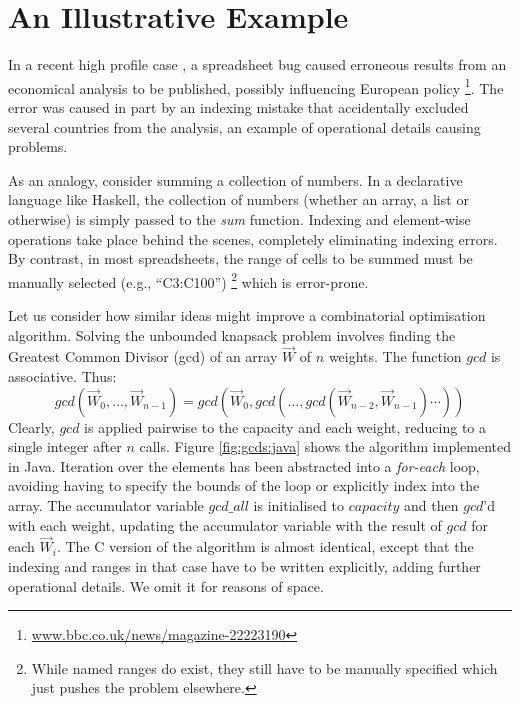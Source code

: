 \section{An Illustrative Example}

In a recent high profile case \cite{Herndon13}, a spreadsheet bug caused
erroneous results from an economical analysis to be published, possibly
influencing European policy%
\footnote{\url{www.bbc.co.uk/news/magazine-22223190}}.
The error was caused in part by an indexing mistake that accidentally excluded
several countries from the analysis, an example of operational details causing
problems.

As an analogy, consider summing a collection of numbers. In a declarative
language like Haskell, the collection of numbers (whether an array, a list or
otherwise) is simply passed to the \emph{sum} function. Indexing and
element-wise operations take place behind the scenes, completely eliminating
indexing errors. By contrast, in most spreadsheets, the range of cells to
be summed must be manually selected (e.g., ``C3:C100'')%
\footnote{While named ranges do exist, they still have to be manually specified
which just pushes the problem elsewhere.} which is error-prone.

Let us consider how similar ideas might improve a combinatorial
optimisation algorithm. Solving the unbounded knapsack problem involves
finding the Greatest Common Divisor (gcd) of an array $\vec{W}$ of $n$
weights. The function $gcd$
is associative. Thus:
\[
gcd (\vec{W}_0, \ldots, \vec{W}_{n-1}) =
gcd(\vec{W}_0,gcd(\ldots,gcd (\vec{W}_{n-2},\vec{W}_{n-1})\cdots))
\]
Clearly, $gcd$ is applied pairwise to the capacity and each weight,
reducing to a single integer after $n$ calls. Figure \ref{fig:gcds:java} shows
the algorithm implemented in Java. Iteration over the elements has been
abstracted into a \emph{for-each} loop, avoiding having to specify the bounds
of the loop or explicitly index into the array. The accumulator variable $gcd\_all$ is initialised to
$capacity$ and then $gcd$'d with each weight, updating the accumulator
variable with the result of $gcd$ for each $\vec{W}_i$. The C version of
the algorithm is almost identical, except that the indexing and ranges in that case have
to be written explicitly, adding further operational details. We omit it for
reasons of space.

